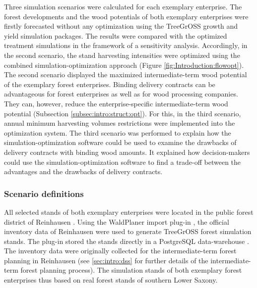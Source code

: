 Three simulation scenarios were calculated for each exemplary enterprise. The forest developments and the wood potentials of both exemplary enterprises were firstly forecasted without any optimization using the TreeGrOSS growth and yield simulation packages. The results were compared with the optimized treatment simulations in the framework of a sensitivity analysis. Accordingly, in the second scenario, the stand harvesting intensities were optimized using the combined si\-mu\-la\-tion-op\-ti\-mi\-za\-tion approach (Figure \ref{fig:Introduction:flowopt}). The second scenario displayed the maximized intermediate-term wood potential of the exemplary forest enterprises. Binding delivery contracts can be advantageous for forest enterprises as well as for wood processing companies. They can, however, reduce the enterprise-specific intermediate-term wood potential (Subsection \ref{subsec:intro:struct:opt}). For this, in the third scenario, annual minimum harvesting volumes restrictions were implemented into the optimization system. The third scenario was performed to explain how the si\-mu\-la\-tion-op\-ti\-mi\-za\-tion software could be used to examine the drawbacks of delivery contracts with binding wood amounts. It explained how decision-makers could use the si\-mu\-la\-tion-op\-ti\-mi\-za\-tion software to find a trade-off between the advantages and the drawbacks of delivery contracts.

\subsubsection{Scenario definitions}
\label{subsubsec:discussion:struct:opt:application:method}
All selected stands of both exemplary enterprises were located in the public forest district of Reinhausen \citep{nlf_2017}. Using the WaldPlaner import plug-in \citep[p. 58]{hansen_2014}, the official inventory data of Reinhausen were used to generate TreeGrOSS forest simulation stands. The plug-in stored the stands directly in a PostgreSQL data-warehouse \citep{eisentraut_2003}. The inventory data were originally collected for the intermediate-term forest planning in Reinhausen (see \ref{sec:intro:dss} for further details of the intermediate-term forest planning process). The simulation stands of both exemplary forest enterprises thus based on real forest stands of southern Lower Saxony.

